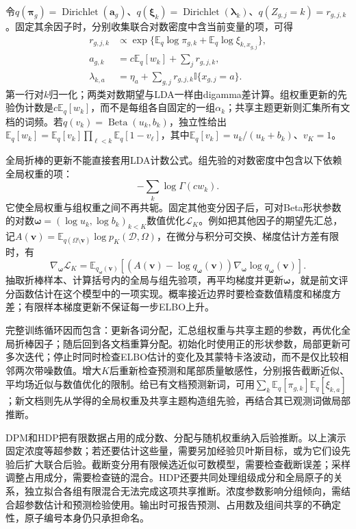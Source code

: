 令$q(\bm\pi_g)=\operatorname{Dirichlet}(\bm a_g)$、$q(\bm\xi_k)=\operatorname{Dirichlet}(\bm\lambda_k)$、$q(Z_{g,j}=k)=r_{g,j,k}$。固定其余因子时，分别收集联合对数密度中含当前变量的项，可得
\begin{equation}
 \begin{aligned}
 r_{g,j,k}&\propto\exp\{\mathbb E_q\log\pi_{g,k}
                          +\mathbb E_q\log\xi_{k,x_{g,j}}\},\\
 a_{g,k}&=c\mathbb E_q[w_k]+\sum_jr_{g,j,k},\\
 \lambda_{k,a}&=\eta_a+\sum_{g,j}r_{g,j,k}\mathbb I\{x_{g,j}=a\}.
 \end{aligned}
 \label{eq:pgm-static-directed-hdp-local-vi}
\end{equation}
第一行对$k$归一化；两类对数期望与LDA一样由digamma差计算。组权重更新的先验伪计数是$c\mathbb E_q[w_k]$，而不是每组各自固定的一组$\alpha_k$；共享主题更新则汇集所有文档的词频。若$q(v_k)=\operatorname{Beta}(u_k,b_k)$，独立性给出$\mathbb E_q[w_k]=\mathbb E_q[v_k]\prod_{\ell<k}\mathbb E_q[1-v_\ell]$，其中$\mathbb E_q[v_k]=u_k/(u_k+b_k)$、$v_K=1$。

全局折棒的更新不能直接套用LDA计数公式。组先验的对数密度中包含以下依赖全局权重的项：
\[
 -\sum_k\log\Gamma(cw_k).
\]
它使全局权重与组权重之间不再共轭。固定其他变分因子后，可对Beta形状参数的对数$\bm\omega=(\log u_k,\log b_k)_{k<K}$数值优化$\mathcal L_K$。例如把其他因子的期望先汇总，记$A(\bm v)=\mathbb E_{q(\Omega\setminus\bm v)}\log p_K(\mathcal D,\Omega)$，在微分与积分可交换、梯度估计方差有限时，有
\[
 \nabla_{\bm\omega}\mathcal L_K
 =\mathbb E_{q_{\bm\omega}(\bm v)}
 [(A(\bm v)-\log q_{\bm\omega}(\bm v))
                     \nabla_{\bm\omega}\log q_{\bm\omega}(\bm v)].
\]
抽取折棒样本、计算括号内的全局与组先验项，再平均梯度并更新$\bm\omega$，就是前文评分函数估计在这个模型中的一项实现。概率接近边界时要检查数值精度和梯度方差；有限样本梯度更新不保证每一步ELBO上升。

完整训练循环因而包含：更新各词分配，汇总组权重与共享主题的参数，再优化全局折棒因子；随后回到各文档重算分配。初始化时使用正的形状参数，局部更新可多次迭代；停止时同时检查ELBO估计的变化及其蒙特卡洛波动，而不是仅比较相邻两次带噪数值。增大$K$后重新检查预测和尾部质量敏感性，分别报告截断近似、平均场近似与数值优化的限制。给已有文档预测新词，可用$\sum_k\mathbb E_q[\pi_{g,k}]\mathbb E_q[\xi_{k,a}]$；新文档则先从学得的全局权重及共享主题构造组先验，再结合其已观测词做局部推断。

DPM和HDP把有限数据占用的成分数、分配与随机权重纳入后验推断。以上演示固定浓度等超参数；若还要估计这些量，需要另加经验贝叶斯目标，或为它们设先验后扩大联合后验。截断变分用有限候选近似可数模型，需要检查截断误差；采样调整占用成分，需要检查链的混合。HDP还要共同处理组级成分和全局原子的关系，独立拟合各组有限混合无法完成这项共享推断。浓度参数影响分组倾向，需结合超参数估计和预测检验使用。输出时可报告预测、占用数及组间共享的不确定性，原子编号本身仍只承担命名。

